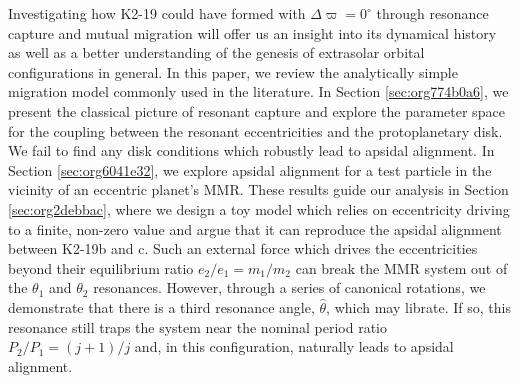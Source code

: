 \documentclass[usenatbib,twocolumn]{mnras}
\begin{document}
Investigating how K2-19 could have formed with \(\Delta\varpi=0^\circ\)
through resonance capture and mutual migration will offer us an
insight into its dynamical history as well as a better understanding
of the genesis of extrasolar orbital configurations in general.  In
this paper, we review the analytically simple migration model commonly
used in the literature.  In Section \ref{sec:org774b0a6}, we present the classical picture of resonant capture and
explore the parameter space for the coupling between the resonant
eccentricities and the protoplanetary disk. We fail to find any disk
conditions which robustly lead to apsidal alignment.  In Section \ref{sec:org6041e32}, we explore apsidal alignment for a test particle in
the vicinity of an eccentric planet's MMR. These results guide our
analysis in Section \ref{sec:org2debbac}, where we design a toy model which
relies on eccentricity driving to a finite, non-zero value and argue
that it can reproduce the apsidal alignment between K2-19b and c.
Such an external force which drives the eccentricities beyond their
equilibrium ratio \(e_2/e_1 = m_1/m_2\) can
break the MMR system out of the \(\theta_1\) and \(\theta_2\) resonances.
However, through a series of canonical rotations, we demonstrate that
there is a third resonance angle, \(\hat\theta\), which may
librate.  If so, this resonance still traps the system near the nominal
period ratio \(P_2/P_1=(j+1)/j\) and, in this configuration, naturally
leads to apsidal alignment.
\end{document}
